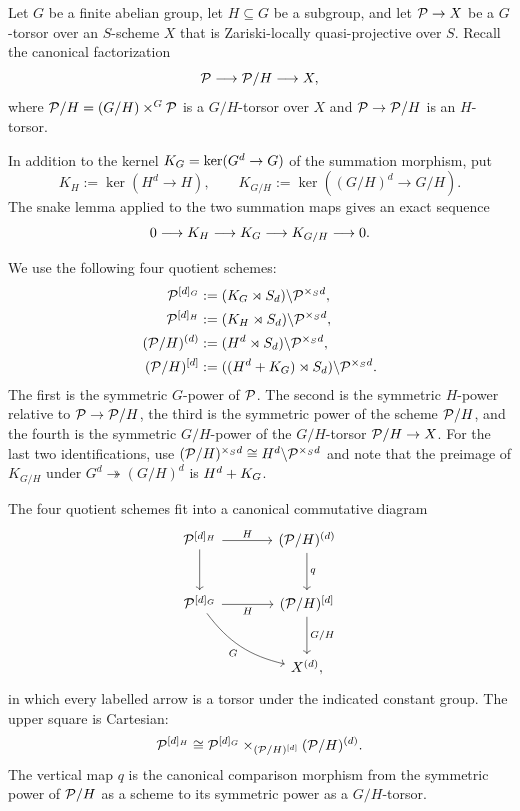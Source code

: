 Let $G$ be a finite abelian group, let $H\subseteq G$ be a subgroup, and let
$\mathcal{P}\to X$ be a $G$-torsor over an $S$-scheme $X$ that is Zariski-locally
quasi-projective over $S$. Recall the canonical factorization
\[
\mathcal{P}\longrightarrow\mathcal{P}/H\longrightarrow X,
\]
where $\mathcal{P}/H=(G/H)\times^G\mathcal{P}$ is a $G/H$-torsor over $X$ and
$\mathcal{P}\to\mathcal{P}/H$ is an $H$-torsor.

In addition to the kernel $K_{G}=\ker(G^d\to G)$ of the summation morphism,
put
\[
K_H:=\ker(H^d\to H),\qquad
K_{G/H}:=\ker((G/H)^d\to G/H).
\]
The snake lemma applied to the two summation maps gives an exact sequence
\begin{equation}\label{eq:summation_kernels_ses}
0\longrightarrow K_H\longrightarrow K_{G}\longrightarrow K_{G/H}
\longrightarrow0.
\end{equation}

We use the following four quotient schemes:
\begin{align*}
  \mathcal{P}^{[d]_G}&:=(K_{G}\rtimes S_d)\backslash\mathcal{P}^{\times_S d},\\
  \mathcal{P}^{[d]_H}&:=(K_H\rtimes S_d)\backslash\mathcal{P}^{\times_S d},\\
  (\mathcal{P}/H)^{(d)}&:=(H^d\rtimes S_d)\backslash\mathcal{P}^{\times_S d},\\
  (\mathcal{P}/H)^{[d]}&:=((H^d+K_{G})\rtimes S_d)
      \backslash\mathcal{P}^{\times_S d}.
\end{align*}
The first is the symmetric $G$-power of $\mathcal{P}$. The second is the symmetric
$H$-power relative to $\mathcal{P}\to\mathcal{P}/H$, the third is the symmetric power of the
scheme $\mathcal{P}/H$, and the fourth is the symmetric $G/H$-power of the
$G/H$-torsor $\mathcal{P}/H\to X$. For the last two identifications, use
$(\mathcal{P}/H)^{\times_S d}\cong H^d\backslash\mathcal{P}^{\times_S d}$ and note that the
preimage of $K_{G/H}$ under $G^d\twoheadrightarrow(G/H)^d$ is
$H^d+K_{G}$.

\begin{prop}\label{prop:torsor_tower_diagram}
The four quotient schemes fit into a canonical commutative diagram
\[
\begin{tikzcd}[row sep=large, column sep=large]
  \cP^{[d]_H}\arrow[r,"H"]\arrow[d]
    &(\cP/H)^{(d)}\arrow[d,"q"]\\
  \cP^{[d]_G}\arrow[r,"H"']\arrow[dr,"G"',bend right=20]
    &(\cP/H)^{[d]}\arrow[d,"G/H"]\\
    &X^{(d)},
\end{tikzcd}
\]
in which every labelled arrow is a torsor under the indicated constant
group. The upper square is Cartesian:
\[
\mathcal{P}^{[d]_H}\cong
\mathcal{P}^{[d]_G}\times_{(\mathcal{P}/H)^{[d]}}(\mathcal{P}/H)^{(d)}.
\]
The vertical map $q$ is the canonical comparison morphism from the symmetric
power of $\mathcal{P}/H$ as a scheme to its symmetric power as a $G/H$-torsor.
\end{prop}

